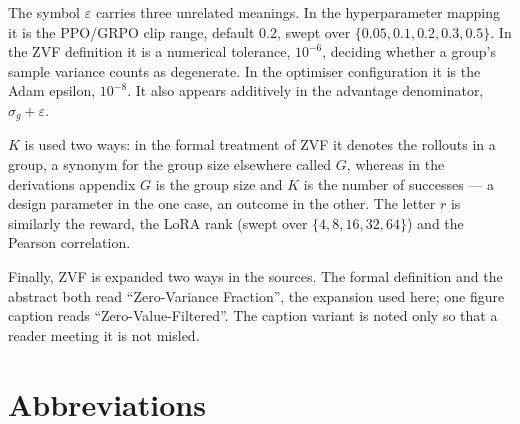 \documentclass[12pt,a4paper]{report}
\begin{document}
The symbol \(\varepsilon\) carries three unrelated meanings. In the
hyperparameter mapping it is the PPO/GRPO clip range, default 0.2, swept
over \(\{0.05, 0.1, 0.2, 0.3, 0.5\}\). In the ZVF definition it is a
numerical tolerance, \(10^{-6}\), deciding whether a group's sample
variance counts as degenerate. In the optimiser configuration it is the
Adam epsilon, \(10^{-8}\). It also appears additively in the advantage
denominator, \(\sigma_g + \varepsilon\).

\(K\) is used two ways: in the formal treatment of ZVF it denotes the
rollouts in a group, a synonym for the group size elsewhere called
\(G\), whereas in the derivations appendix \(G\) is the group size and
\(K\) is the number of successes --- a design parameter in the one case,
an outcome in the other. The letter \(r\) is similarly the reward, the
LoRA rank (swept over \(\{4,8,16,32,64\}\)) and the Pearson correlation.

Finally, ZVF is expanded two ways in the sources. The formal definition
and the abstract both read ``Zero-Variance Fraction'', the expansion
used here; one figure caption reads ``Zero-Value-Filtered''. The caption
variant is noted only so that a reader meeting it is not misled.

\section{Abbreviations}\label{abbreviations}
\end{document}
